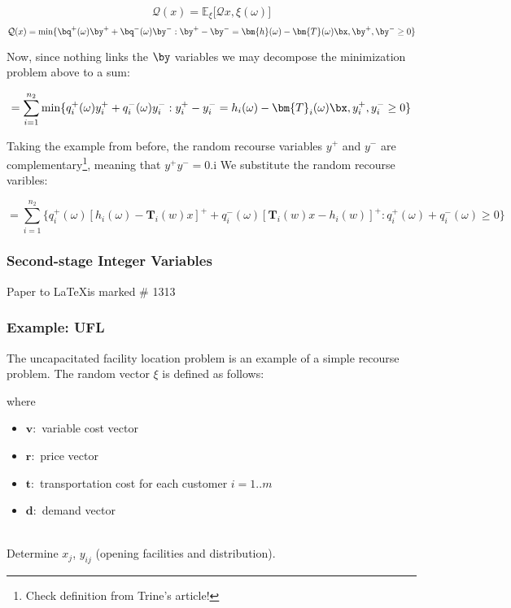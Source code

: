 \[
\mathcal{Q}(x) = \mathbb{E}_{\xi}\big[ \mathcal{Q} x, \xi(\omega) \big]
\]
\[
\mathcal{Q}(x) = \text{min} \{\bq^+(\omega)\by^+ + \bq^-(\omega)\by^- : \by^+ - \by^- = \bm{h}(\omega) - \bm{T}(\omega)\bx, \by^+, \by^- \geq 0 \}
\]

Now, since nothing links the $\by$ variables we may decompose the minimization problem
above to a sum:

\[
= \sum_{i=1}^{n_2} \text{min} \{q_i^+(\omega)y_i^+ + q_i^-(\omega)y_i^- : y_i^+ - y_i^- = h_i(\omega) - \bm{T}_i(\omega)\bx, y_i^+, y_i^- \geq 0 \}
\]


Taking the example from before, the random recourse variables $y^+$ and $y^-$ are
complementary\footnote{Check definition from Trine's article!}, meaning that $y^+ y^- = 0$.i
We substitute the random recourse varibles:

\[
= \sum_{i=1}^{n_2} \{q_i^+(\omega)[h_i(\omega) - \bm{T}_i(w)x]^+ + q_i^-(\omega)[\bm{T}_i(w)x - h_i(w)]^+ : q_i^+(\omega) + q_i^-(\omega) \geq 0 \}
\]

\subsubsection{Second-stage Integer Variables}

Paper to \LaTeX is marked \# 1313

\subsubsection{Example: UFL}

The uncapacitated facility location problem is an example of a simple recourse problem.
The random vector $\xi$ is defined as follows:


where

\begin{itemize}
\item $\bm{v}:$ variable cost vector
\item $\bm{r}:$ price vector
\item $\bm{t}:$ transportation cost for each customer $i=1..m$
\item $\bm{d}:$ demand vector
\end{itemize}

\stone\\

Determine $x_j$, $y_{ij}$ (opening facilities and distribution).\\


